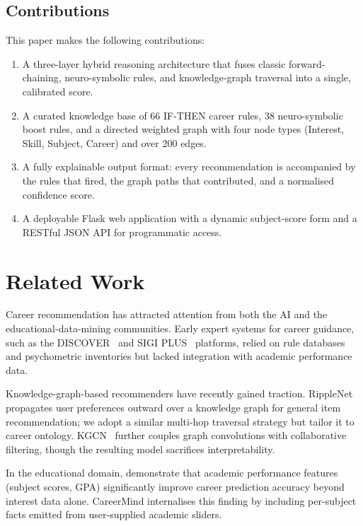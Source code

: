 \documentclass[runningheads]{llncs}
\begin{document}
\subsection{Contributions}

\noindent This paper makes the following contributions:
\begin{enumerate}
  \item A three-layer hybrid reasoning architecture that fuses classic
        forward-chaining, neuro-symbolic rules, and knowledge-graph traversal
        into a single, calibrated score.
  \item A curated knowledge base of 66 IF-THEN career rules, 38 neuro-symbolic
        boost rules, and a directed weighted graph with four node types (Interest,
        Skill, Subject, Career) and over 200 edges.
  \item A fully explainable output format: every recommendation is accompanied
        by the rules that fired, the graph paths that contributed, and a
        normalised confidence score.
  \item A deployable Flask web application with a dynamic subject-score form
        and a RESTful JSON API for programmatic access.
\end{enumerate}

\section{Related Work}
\label{sec:related}

Career recommendation has attracted attention from both the AI and the
educational-data-mining communities.  Early expert systems for career guidance,
such as the DISCOVER~\cite{mckinlay1999computer} and SIGI
PLUS~\cite{katz1993computer} platforms, relied on rule databases and
psychometric inventories but lacked integration with academic performance data.

Knowledge-graph-based recommenders have recently gained traction.  RippleNet
\cite{wang2018ripplenet} propagates user preferences outward over a knowledge
graph for general item recommendation; we adopt a similar multi-hop traversal
strategy but tailor it to career ontology.
KGCN~\cite{wang2019knowledge} further couples graph convolutions with
collaborative filtering, though the resulting model sacrifices interpretability.

In the educational domain, \citet{al2019student} demonstrate that academic
performance features (subject scores, GPA) significantly improve career
prediction accuracy beyond interest data alone.  CareerMind internalises this
finding by including per-subject facts emitted from user-supplied academic
sliders.
\end{document}
